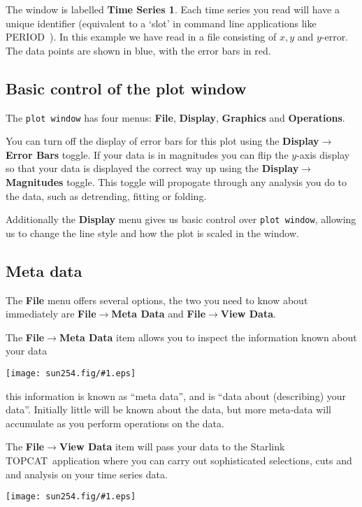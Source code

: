 \documentclass[twoside,11pt]{article}
\newcommand{\htmladdimg}[1]{}
\newcommand{\latexhtml}[2]{#1}
\newcommand{\xlabel}[1]{}
\renewcommand{\_}{\texttt{\symbol{95}}}
\newcommand{\TOPCAT}{\textsf{TOPCAT}}
\newcommand{\PERIOD}{\textsf{PERIOD}}
\newcommand{\mainfigure}[1]
{\begin{center}
 \latexhtml{\texttt{[image: sun254.fig/\#1.eps]}}{\htmladdimg{../sun254.fig/#1.gif}}
 \end{center}
}
\newcommand{\menuitem}[1]{\textbf{#1}}
\newcommand{\submenuitem}[2]{\latexhtml{\textbf{#1$\rightarrow$#2}}{\textbf{#1=>#2}}}
\newcommand{\labelitem}[1]{\textbf{#1}}
\newcommand{\hitext}[1]{\texttt{#1}}
\begin{document}
The window is labelled \labelitem{Time Series 1}. Each time series you read will have a unique identifier (equivalent to a `slot' in command line applications like \PERIOD\ ). In this example we have read in a file consisting of $x, y$ and $y$-error. The data points are shown in blue, with the error bars in red. 

\subsection{Basic control of the plot window\xlabel{basic_control}}

The \hitext{plot window} has four menus: \menuitem{File}, \menuitem{Display}, \menuitem{Graphics} and \menuitem{Operations}. 

You can turn off the display of error bars for this plot using the \submenuitem{Display}{Error Bars} toggle. If your data is in magnitudes you can flip the $y$-axis display so that your data is displayed the correct way up using the \submenuitem{Display}{Magnitudes} toggle. This toggle will propogate through any analysis you do to the data, such as detrending, fitting or folding.

Additionally the \menuitem{Display} menu gives us basic control over \hitext{plot window}, allowing us to change the line style and how the plot is scaled in the window. 

\subsection{Meta data\xlabel{meta_data}}

The \menuitem{File} menu offers several options, the two you need to know about immediately are \submenuitem{File}{Meta Data} and \submenuitem{File}{View Data}.

The \submenuitem{File}{Meta Data} item allows you to inspect the information known about your data

\mainfigure{meta_data1}

this information is known as ``meta data'', and is ``data about (describing) your data''. Initially little will be known about the data, but more meta-data will accumulate as you perform operations on the data.

The \submenuitem{File}{View Data} item will pass your data to the Starlink \TOPCAT\ application where you can carry out sophisticated selections, cuts and and analysis on your time series data.

\mainfigure{topcat}
\end{document}
